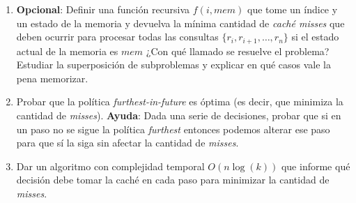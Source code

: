 \begin{enumerate}[label=$\alph*)$,ref=$\alph*)$]
    \item \textbf{Opcional}: Definir una función recursiva $f(i, mem)$ que tome un índice y un estado de la memoria y devuelva la mínima cantidad de \textit{caché misses} que deben ocurrir para procesar todas las consultas $\{r_i, r_{i+1}, \ldots, r_n\}$ si el estado actual de la memoria es $mem$ ¿Con qué llamado se resuelve el problema? Estudiar la superposición de subproblemas y explicar en qué casos vale la pena memorizar.
    
    \item Probar que la política \textit{furthest-in-future} es óptima (es decir, que minimiza la cantidad de \textit{misses}). \textbf{Ayuda}: Dada una serie de decisiones, probar que si en un paso no se sigue la política \textit{furthest} entonces podemos alterar ese paso para que sí la siga sin afectar la cantidad de \textit{misses}. 
    \item Dar un algoritmo con complejidad temporal $O(n \log (k))$ que informe qué decisión debe tomar la caché en cada paso para minimizar la cantidad de \textit{misses}.
\end{enumerate}
